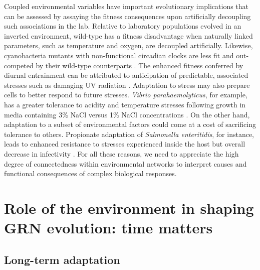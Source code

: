 Coupled environmental variables have important evolutionary implications that can be assessed by assaying the fitness consequences upon artificially decoupling such associations in the lab.  Relative to laboratory populations evolved in an inverted environment, wild-type \eco has a fitness disadvantage when naturally linked parameters, such as temperature and oxygen, are decoupled artificially. Likewise, cyanobacteria mutants with non-functional circadian clocks are less fit and out-competed by their wild-type counterparts \cite{johnson_cyanobacterial_2008}.  The enhanced fitness conferred by diurnal entrainment can be attributed to anticipation of predictable, associated stresses such as damaging UV radiation \cite{woelfle_adaptive_2004}.   Adaptation to stress may also prepare cells to better respond to future stresses. \textit{Vibrio parahaemolyticus}, for example, has a greater tolerance to acidity and temperature stresses following growth in media containing 3\% NaCl versus 1\% NaCl concentrations \cite{whitaker_modulation_2010}.  On the other hand, adaptation to a subset of environmental factors could come at a cost of sacrificing tolerance to others. Propionate adaptation of \textit{Salmonella enteritidis}, for instance, leads to enhanced resistance to stresses experienced inside the host but overall decrease in infectivity \cite{calhoun_effect_2010}.  For all these reasons, we need to appreciate the high degree of connectedness within environmental networks to interpret causes and functional consequences of complex biological responses.   

\section{Role of the environment in shaping GRN evolution: time matters} 

\subsection{Long-term adaptation}   

